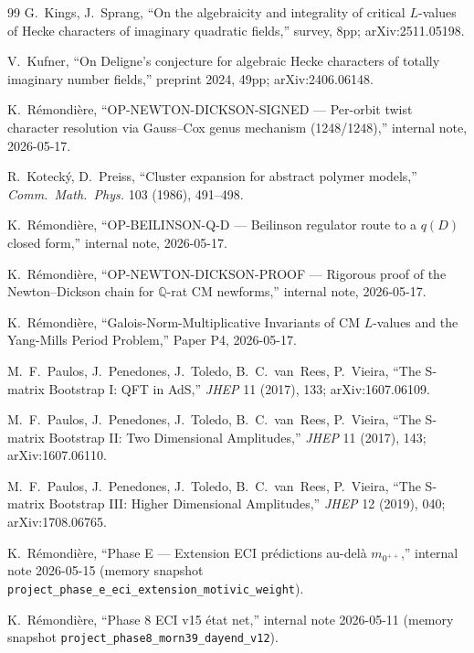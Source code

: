 \documentclass[11pt]{amsart}
\theoremstyle{definition}
\theoremstyle{remark}
\newcommand{\Q}{\mathbb{Q}}
\begin{document}
\begin{thebibliography}{99}
 G.~Kings, J.~Sprang, ``On the
algebraicity and integrality of critical $L$-values of Hecke
characters of imaginary quadratic fields,'' survey, 8pp;
arXiv:2511.05198.

 V.~Kufner, ``On Deligne's conjecture for
algebraic Hecke characters of totally imaginary number fields,''
preprint 2024, 49pp; arXiv:2406.06148.

 K.~R\'emondi\`ere, ``OP-NEWTON-DICKSON-SIGNED
--- Per-orbit twist character resolution via Gauss--Cox genus
mechanism (1248/1248),'' internal note, 2026-05-17.

 R.~Koteck\'y, D.~Preiss, ``Cluster
expansion for abstract polymer models,'' \emph{Comm.\ Math.\ Phys.}
103 (1986), 491--498.

 K.~R\'emondi\`ere, ``OP-BEILINSON-Q-D ---
Beilinson regulator route to a $q(D)$ closed form,'' internal note,
2026-05-17.

 K.~R\'emondi\`ere, ``OP-NEWTON-DICKSON-PROOF
--- Rigorous proof of the Newton--Dickson chain for $\Q$-rat CM
newforms,'' internal note, 2026-05-17.

 K.~R\'emondi\`ere, ``Galois-Norm-Multiplicative
Invariants of CM $L$-values and the Yang-Mills Period Problem,''
Paper P4, 2026-05-17.

 M.~F.~Paulos, J.~Penedones, J.~Toledo,
B.~C.~van~Rees, P.~Vieira, ``The S-matrix Bootstrap I: QFT in AdS,''
\emph{JHEP} 11 (2017), 133; arXiv:1607.06109.

 M.~F.~Paulos, J.~Penedones, J.~Toledo,
B.~C.~van~Rees, P.~Vieira, ``The S-matrix Bootstrap II: Two
Dimensional Amplitudes,'' \emph{JHEP} 11 (2017), 143;
arXiv:1607.06110.

 M.~F.~Paulos, J.~Penedones, J.~Toledo,
B.~C.~van~Rees, P.~Vieira, ``The S-matrix Bootstrap III: Higher
Dimensional Amplitudes,'' \emph{JHEP} 12 (2019), 040;
arXiv:1708.06765.

 K.~R\'emondi\`ere, ``Phase E --- Extension ECI
pr\'edictions au-del\`a $m_{0^{++}}$,'' internal note 2026-05-15
(memory snapshot \texttt{project\_phase\_e\_eci\_extension\_motivic\_weight}).

 K.~R\'emondi\`ere, ``Phase 8 ECI v15 \'etat net,''
internal note 2026-05-11
(memory snapshot \texttt{project\_phase8\_morn39\_dayend\_v12}).


\end{thebibliography}
\end{document}
